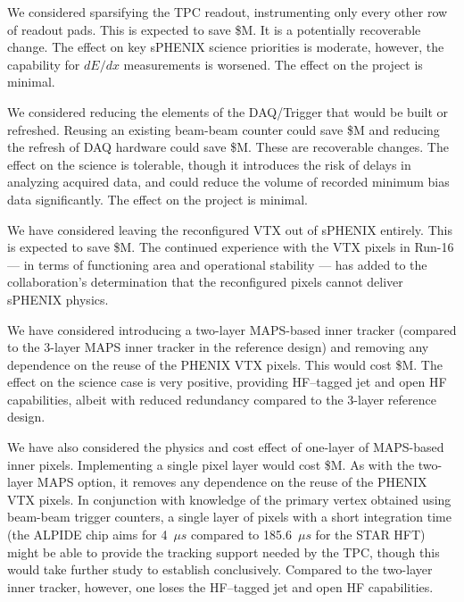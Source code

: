 We considered sparsifying the TPC readout, instrumenting only every
other row of readout pads.  This is expected to save
\${\reducedTPCreadout}M.  It is a potentially recoverable change. The
effect on key sPHENIX science priorities is moderate, however, the
capability for $dE/dx$ measurements is worsened.  The effect on the
project is minimal.

We considered reducing the elements of the DAQ/Trigger that would be
built or refreshed.  Reusing an existing beam-beam counter could save
\${\reuseBBC}M and reducing the refresh of DAQ hardware could save
\${\reducedDAQ}M.  These are recoverable changes.  The effect on the
science is tolerable, though it introduces the risk of delays in
analyzing acquired data, and could reduce the volume of recorded
minimum bias data significantly. The effect on the project is minimal.

We have considered leaving the reconfigured VTX out of sPHENIX
entirely.  This is expected to save \${\noVTX}M.  The continued experience
with the VTX pixels in Run-16 --- in terms of functioning area and
operational stability --- has added to the collaboration's
determination that the reconfigured pixels cannot deliver sPHENIX
physics. 

We have considered introducing a two-layer MAPS-based inner tracker
(compared to the 3-layer MAPS inner tracker in the reference design)
and removing any dependence on the reuse of the PHENIX VTX pixels.
This would cost \${\twoLayerMAPS}M.  The effect on the science case is very
positive, providing HF--tagged jet and open HF capabilities, albeit
with reduced redundancy compared to the 3-layer reference design. 

We have also considered the physics and cost effect of one-layer of
MAPS-based inner pixels.  Implementing a single pixel layer would cost
\${\oneLayerMAPS}M.  As with the two-layer MAPS option, it removes any
dependence on the reuse of the PHENIX VTX pixels.  In conjunction with
knowledge of the primary vertex obtained using beam-beam trigger
counters, a single layer of pixels with a short integration time (the
ALPIDE chip aims for 4~$\mu s$ compared to 185.6~$\mu s$ for the STAR
HFT) might be able to provide the tracking support needed by the TPC,
though this would take further study to establish conclusively.
Compared to the two-layer inner tracker, however, one loses the
HF--tagged jet and open HF capabilities.







